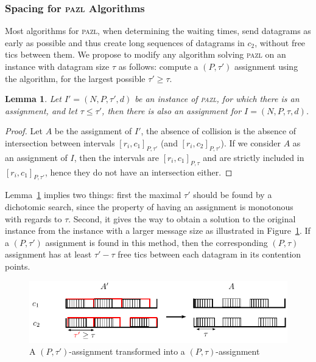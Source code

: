 \documentclass[a4paper,10pt]{article}
\newtheorem{lemma}[theorem]{Lemma}
\newcommand\pazl{\textsc{pazl}\xspace}
\begin{document}
    
    \subsubsection{Spacing for \pazl Algorithms}

    Most algorithms for \pazl, when determining the waiting times, send datagrams as early as possible
    and thus create long sequences of datagrams in $c_2$, without free tics between them. We propose to modify any algorithm solving \pazl on an instance with datagram size $\tau$ as follows: compute a $(P,\tau')$ assignment using the algorithm, for the largest possible $\tau' \geq \tau$. 

    \begin{lemma}\label{lemma:smaller_tau}
    Let $I' = (N,P,\tau',d)$ be an instance of \pazl, for which there is an assignment, and let 
    $\tau \leq \tau'$, then there is also an assignment for $I = (N,P,\tau,d)$.
    \end{lemma}  
    \begin{proof}
    Let $A$ be the assignment of $I'$, the absence of collision is the absence of 
    intersection between intervals $[r_i,c_1]_{P,\tau'}$ (and $[r_i,c_2]_{P,\tau'}$). 
    If we consider $A$ as an assignment of $I$, then the intervals are $[r_i,c_1]_{P,\tau}$ and 
    are strictly included in $[r_i,c_1]_{P,\tau'}$, hence they do not have an intersection either. 
    \end{proof}

    Lemma~\ref{lemma:smaller_tau} implies two things: first the maximal $\tau'$ should be found by a dichotomic search, since the property of having an assignment is monotonous with regards to $\tau$. Second, it gives the way to obtain a solution to the original instance from the instance with a larger message size as illustrated in Figure~\ref{fig:space}. If a $(P,\tau')$ assignment is found in this method, then the corresponding $(P,\tau)$ assignment has at least $\tau' - \tau$ free tics between each datagram in its contention points. 

           \begin{figure}
       \begin{center}
      \includegraphics[width = \textwidth]{space.pdf}
      \end{center} 
      \caption{A $(P,\tau')$-assignment transformed into a $(P,\tau)$-assignment}
      \label{fig:space}   
     \end{figure}   
\end{document}
